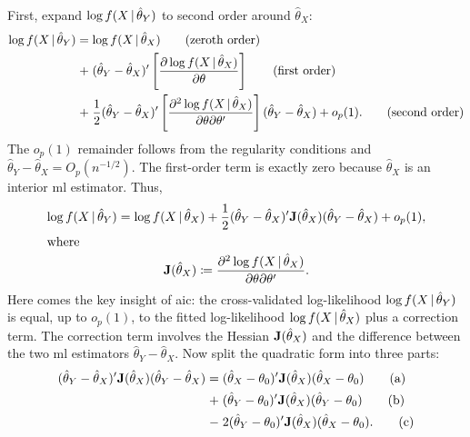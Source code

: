 \documentclass[a4paper,12pt]{article}
\begin{document}
First, expand $\log f(X\,|\,\hat\theta_{Y})$ to second order around $\hat\theta_{X}$:
\begin{align*}
	\log f(X\,|\,\hat\theta_{Y})
	&=
	\log f(X\,|\,\hat\theta_{X}) \tag{zeroth order}\\
	&\mathrel{+}
	(\hat\theta_{Y}-\hat\theta_{X})^{\prime}
	\left[\frac{\partial\log f(X\,|\,\hat\theta_{X})}{\partial\theta}\right] \tag{first order}\\
	&\mathrel{+}
	\frac12
	(\hat\theta_{Y}-\hat\theta_{X})^{\prime}
	\left[
	\frac{\partial^2\log f(X\,|\,\hat\theta_{X})}{\partial\theta\partial\theta^{\prime}}
	\right]
	(\hat\theta_{Y}-\hat\theta_{X})
	+o_p(1). \tag{second order}
\end{align*}
The $o_p(1)$ remainder follows from the regularity conditions and
$\hat\theta_Y-\hat\theta_X=O_p(n^{-1/2})$.
The first-order term is exactly zero because $\hat\theta_{X}$ is an interior \acrshort{ml} estimator.
Thus,
\begin{gather}
	\log f(X\,|\,\hat\theta_{Y})
	=
	\log f(X\,|\,\hat\theta_{X})
	+
	\frac12
	(\hat\theta_{Y}-\hat\theta_{X})^{\prime}
	\mathbf{J}(\hat\theta_{X})
	(\hat\theta_{Y}-\hat\theta_{X})
	+o_p(1), \label{eq:taylor}\\
	\shortintertext{where}
	\mathbf{J}(\hat\theta_{X})
	\coloneqq
	\frac{\partial^2\log f(X\,|\,\hat\theta_{X})}{\partial\theta\partial\theta^{\prime}}.
	\notag
\end{gather}
Here comes the key insight of \acrshort{aic}:
the cross-validated log-likelihood $\log f(X\,|\,\hat\theta_{Y})$ is equal, up to $o_p(1)$, to
the fitted log-likelihood $\log f(X\,|\,\hat\theta_{X})$ plus a correction term.
The correction term involves the Hessian $\mathbf{J}(\hat\theta_{X})$ and the difference between the two \acrshort{ml} estimators $\hat\theta_{Y}-\hat\theta_{X}$.
Now split the quadratic form into three parts:
\begin{align*}
	(\hat\theta_{Y}-\hat\theta_{X})^{\prime}
	\mathbf{J}(\hat\theta_{X})
	(\hat\theta_{Y}-\hat\theta_{X})
	&=
	(\hat\theta_{X}-\theta_{0})^{\prime}
	\mathbf{J}(\hat\theta_{X})
	(\hat\theta_{X}-\theta_{0}) \label{eq:part-a}\tag{a}\\
	&\mathrel+
	(\hat\theta_{Y}-\theta_{0})^{\prime}
	\mathbf{J}(\hat\theta_{X})
	(\hat\theta_{Y}-\theta_{0}) \label{eq:part-b}\tag{b}\\
	&\mathrel-
	2(\hat\theta_{Y}-\theta_{0})^{\prime}
	\mathbf{J}(\hat\theta_{X})
	(\hat\theta_{X}-\theta_{0}). \label{eq:part-c}\tag{c}
\end{align*}
\end{document}
